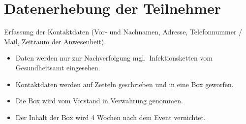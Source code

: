 \documentclass[10pt,a4paper]{scrartcl}
\begin{document}
\section{Datenerhebung der Teilnehmer}
Erfassung der Kontaktdaten (Vor- und Nachnamen, Adresse, Telefonnummer / Mail, Zeitraum der Anwesenheit).
\begin{itemize}
  \item Daten werden nur zur Nachverfolgung mgl.\ Infektionsketten vom Gesundheitsamt eingesehen.
  \item Kontaktdaten werden auf Zetteln geschrieben und in eine Box geworfen.
  \item Die Box wird vom Vorstand in Verwahrung genommen.
  \item Der Inhalt der Box wird 4 Wochen nach dem Event vernichtet.
\end{itemize}
\end{document}
